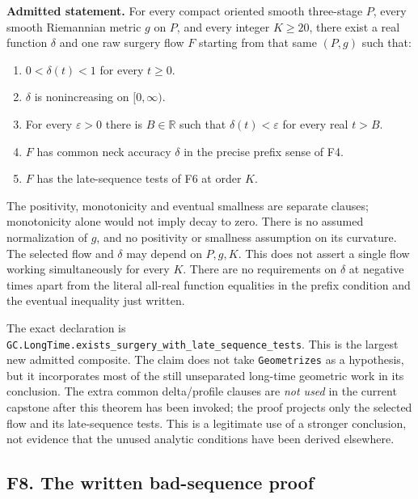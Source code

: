 \documentclass[
  letterpaper,
  11pt]{article}
\providecommand{\tightlist}{%
  \setlength{\itemsep}{0pt}\setlength{\parskip}{0pt}}
\begin{document}
\textbf{Admitted statement.} For every compact oriented smooth
three-stage \(P\), every smooth Riemannian metric \(g\) on \(P\), and
every integer \(K\geq20\), there exist a real function \(\delta\) and
one raw surgery flow \(F\) starting from that same \((P,g)\) such that:

\begin{enumerate}
\def\labelenumi{\arabic{enumi}.}
\tightlist
\item
  \(0<\delta(t)<1\) for every \(t\geq0\).
\item
  \(\delta\) is nonincreasing on \([0,\infty)\).
\item
  For every \(\varepsilon>0\) there is \(B\in\mathbb R\) such that
  \(\delta(t)<\varepsilon\) for every real \(t>B\).
\item
  \(F\) has common neck accuracy \(\delta\) in the precise prefix sense
  of F4.
\item
  \(F\) has the late-sequence tests of F6 at order \(K\).
\end{enumerate}

The positivity, monotonicity and eventual smallness are separate
clauses; monotonicity alone would not imply decay to zero. There is no
assumed normalization of \(g\), and no positivity or smallness
assumption on its curvature. The selected flow and \(\delta\) may depend
on \(P,g,K\). This does not assert a single flow working simultaneously
for every \(K\). There are no requirements on \(\delta\) at negative
times apart from the literal all-real function equalities in the prefix
condition and the eventual inequality just written.

The exact declaration is
{\small\texttt{GC.\allowbreak{}Long\allowbreak{}Time.\allowbreak{}exists\_\allowbreak{}surgery\_\allowbreak{}with\_\allowbreak{}late\_\allowbreak{}sequence\_\allowbreak{}tests}}.
This is the largest new admitted composite. The claim does not take
{\small\texttt{Geometrizes}} as a hypothesis, but it incorporates most
of the still unseparated long-time geometric work in its conclusion. The
extra common delta/profile clauses are \emph{not used} in the current
capstone after this theorem has been invoked; the proof projects only
the selected flow and its late-sequence tests. This is a legitimate use
of a stronger conclusion, not evidence that the unused analytic
conditions have been derived elsewhere.

\subsection{F8. The written bad-sequence
proof}\label{f8-bad-sequence-proof}
\end{document}
